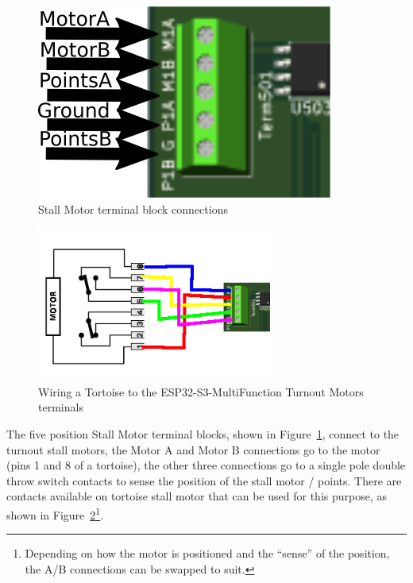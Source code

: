 \begin{figure}[hbpt]\begin{centering}%
\includegraphics{ESP32-S3-MultiFunctionTurnoutMotorsFig.png}
\caption{Stall Motor terminal block connections}
\label{fig:ESP32-S3-MultiFunctionTurnoutMotorsFig}
\end{centering}\end{figure}
\begin{figure}[hbpt]\begin{centering}%
\includegraphics[height=2in]{ESP32-S3-MultiFunctionTotoiseWiring.png}
\caption{Wiring a Tortoise to the ESP32-S3-MultiFunction Turnout Motors terminals}
\label{fig:ESP32-S3-MultiFunctionTotoiseWiring}
\end{centering}\end{figure}

The five position Stall Motor terminal blocks, shown in 
Figure~\ref{fig:ESP32-S3-MultiFunctionTurnoutMotorsFig}, connect to the 
turnout stall motors, the Motor A and Motor B connections go to the motor 
(pins 1 and 8 of a tortoise), the other three connections go to a single pole 
double throw switch contacts to sense the position of the stall motor / 
points. There are contacts available on tortoise stall motor that can be used 
for this purpose, as shown in 
Figure~\ref{fig:ESP32-S3-MultiFunctionTotoiseWiring}\footnote{Depending on how 
the motor is positioned and the ``sense'' of the position, the A/B connections 
can be swapped to suit.}.

